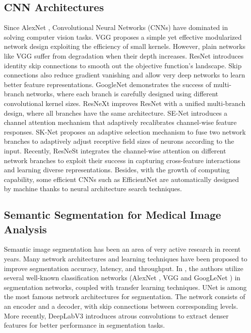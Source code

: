 \documentclass[review, sort&compress]{elsarticle}
\begin{document}
	\subsection{CNN Architectures}
	Since AlexNet \cite{krizhevsky2012imagenet}, Convolutional Neural Networks (CNNs) have dominated in solving computer vision tasks. VGG \cite{simonyan2014very} proposes a simple yet effective modularized network design exploiting the efficiency of small  kernels. However, plain networks like VGG suffer from degradation when their depth increases. ResNet \cite{he2016deep} introduces identity skip connections to smooth out the objective function's landscape. Skip connections also reduce gradient vanishing and allow very deep networks to learn better feature representations. GoogleNet \cite{szegedy2015going} demonstrates the success of multi-branch networks, where each branch is carefully designed using different convolutional kernel sizes. ResNeXt \cite{xie2017aggregated} improves ResNet with a unified multi-branch design, where all branches have the same architecture. SE-Net \cite{hu2018squeeze} introduces a channel attention mechanism that adaptively recalibrates channel-wise feature responses. SK-Net \cite{li2019selective} proposes an adaptive selection mechanism to fuse two network branches to adaptively adjust receptive field sizes of neurons according to the input. Recently, ResNeSt \cite{zhang2020resnest} integrates the channel-wise attention on different network branches to exploit their success in capturing cross-feature interactions and learning diverse representations. Besides, with the growth of computing capability, some efficient CNNs such as EfficientNet \cite{tan2019efficientnet} are automatically designed by machine thanks to neural architecture search techniques.
	
	\subsection{Semantic Segmentation for Medical Image Analysis}
	Semantic image segmentation has been an area of very active research in recent years. Many network architectures and learning techniques have been proposed to improve segmentation accuracy, latency, and throughput. In \cite{long2015fully}, the authors utilize several well-known classification networks (AlexNet \cite{krizhevsky2012imagenet}, VGG \cite{simonyan2014very} and GoogLeNet \cite{szegedy2015going}) in segmentation networks, coupled with transfer learning techniques. UNet \cite{ronneberger2015u} is among the most famous network architectures for segmentation. The network consists of an encoder and a decoder, with skip connections between corresponding levels. More recently, DeepLabV3 \cite{chen2017rethinking} introduces atrous convolutions to extract denser features for better performance in segmentation tasks.
	
\end{document}
